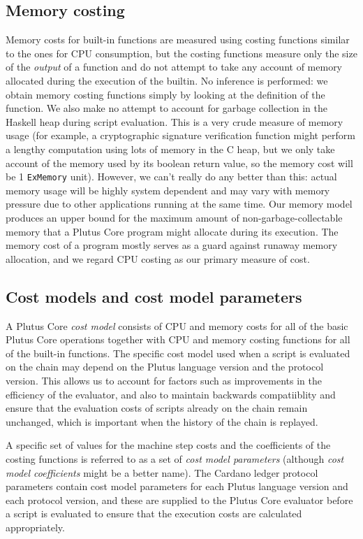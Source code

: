 \documentclass[a4paper]{article}
\begin{document}
\subsection{Memory costing}
Memory costs for built-in functions are measured using costing functions similar
to the ones for CPU consumption, but the costing functions measure only the size
of the \textit{output} of a function and do not attempt to take any account of
memory allocated during the execution of the builtin.  No inference is
performed: we obtain memory costing functions simply by looking at the
definition of the function.  We also make no attempt to account for garbage
collection in the Haskell heap during script evaluation.  This is a very crude
measure of memory usage (for example, a cryptographic signature verification
function might perform a lengthy computation using lots of memory in the C heap,
but we only take account of the memory used by its boolean return value, so the
memory cost will be 1 \texttt{ExMemory} unit).  However, we can't really do any
better than this: actual memory usage will be highly system dependent and may
vary with memory pressure due to other applications running at the same time.
Our memory model produces an upper bound for the maximum amount of
non-garbage-collectable memory that a Plutus Core program might allocate during
its execution.  The memory cost of a program mostly serves as a guard against
runaway memory allocation, and we regard CPU costing as our primary measure of
cost.

\subsection{Cost models and cost model parameters}
A Plutus Core \textit{cost model} consists of CPU and memory costs for all of
the basic Plutus Core operations together with CPU and memory costing functions
for all of the built-in functions.  The specific cost model used when a script
is evaluated on the chain may depend on the Plutus language version and the
protocol version.  This allows us to account for factors such as improvements in
the efficiency of the evaluator, and also to maintain backwards compatiiblity
and ensure that the evaluation costs of scripts already on the chain remain
unchanged, which is important when the history of the chain is replayed.

A specific set of values for the machine step costs and the coefficients of the
costing functions is referred to as a set of \textit{cost model parameters}
(although \textit{cost model coefficients} might be a better name).  The Cardano
ledger protocol parameters contain cost model parameters for each Plutus
language version and each protocol version, and these are supplied to the Plutus
Core evaluator before a script is evaluated to ensure that the execution costs
are calculated appropriately.
\end{document}
